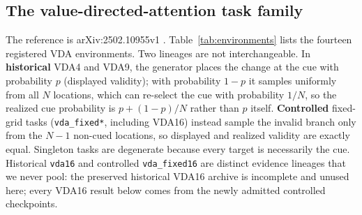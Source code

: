 \documentclass[10pt]{article}
\newcommand{\env}[1]{\texttt{#1}}
\begin{document}
\subsection{The value-directed-attention task family}\label{sec:task-family}
The reference is arXiv:2502.10955v1 \cite{mah2025}. Table~\ref{tab:environments} lists the fourteen registered VDA environments. Two lineages are not interchangeable. In \textbf{historical} VDA4 and VDA9, the generator places the change at the cue with probability $p$ (displayed validity); with probability $1-p$ it samples uniformly from all $N$ locations, which can re-select the cue with probability $1/N$, so the realized cue probability is $p+(1-p)/N$ rather than $p$ itself. \textbf{Controlled} fixed-grid tasks (\env{vda\_fixed*}, including VDA16) instead sample the invalid branch only from the $N-1$ non-cued locations, so displayed and realized validity are exactly equal. Singleton tasks are degenerate because every target is necessarily the cue. Historical \env{vda16} and controlled \env{vda\_fixed16} are distinct evidence lineages that we never pool: the preserved historical VDA16 archive is incomplete and unused here; every VDA16 result below comes from the newly admitted controlled checkpoints.
\end{document}
